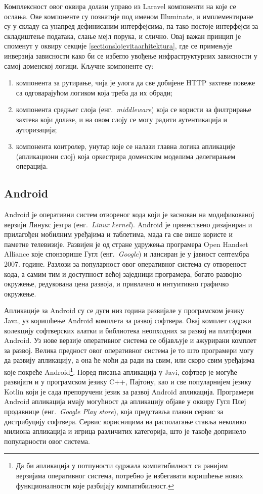 \documentclass[12pt,oneside]{memoir}
\begin{document}
Комплексност овог оквира долази управо из Laravel компоненти на које се ослања. Ове компоненте су познатије под именом Illuminate, и имплементиране су у складу са унапред дефинисаним интерфејсима, па тако постоје интерфејси за складиштење података, слање мејл порука, и слично. Овај важан принцип је споменут у оквиру секције \ref{sectionslojevitaarhitektura}, где се примењује инверзија зависности како би се избегло увођење инфраструктурних зависности у самој доменској логици. Кључне компоненте су:
\begin{enumerate}
\item компонента за рутирање, чија је улога да све добијене HTTP захтеве повеже са одговарајућом логиком која треба да их обради;
\item компонента средњег слоја (енг.~\textit{middleware}) која се користи за филтрирање захтева који долазе, и на овом слоју се могу радити аутентикација и ауторизација;
\item компонента контролер, унутар које се налази главна логика апликације (апликациони слој) која оркестрира доменским моделима делегирањем операција.
\end{enumerate}

\subsection{Android}
Android \cite{Android} је оперативни систем отвореног кода који је заснован на модификованој верзији Линукс језгра (енг.~\textit{Linux kernel}). Android је првенствено дизајниран и прилагођен мобилним уређајима и таблетима, мада га све више користе и паметне телевизије. Развијен је од стране удружења програмера Open Handset Alliance које спонзорише Гугл (енг.~\textit{Google}) и лансиран је у јавност септембра 2007. године. Разлози за популарност овог оперативног система су отвореност кода, а самим тим и доступност већој заједници програмера, богато развојно окружење, редукована цена развоја, и привлачно и интуитивно графичко окружење.

Апликације за Android су се дуги низ година развијале у програмском језику Java, уз коришћење Android комплета за развој софтвера. Овај комплет садржи колекцију софтверских алатки и библиотека неопходних за развој на платформи Android. Уз нове верзије оперативног система се објављује и ажурирани комплет за развој. Велика предност овог оперативног система је то што програмери могу да развију апликацију, а она ће моћи да ради на свим, или скоро свим уређајима које покреће Android\footnote{Да би апликација у потпуности одржала компатибилност са ранијим верзијама оперативног система, потребно је избегавати коришћење нових функционалности које разбијају компатибилност.}. Поред писања апликација у Javi, софтвер је могуће развијати и у програмском језику C++, Пајтону, као и све популарнијем језику Kotlin који је сада препоручени језик за развој Android апликација. Програмери Android апликација имају могућност да апликацију објаве у оквиру Гугл Плеј продавнице (енг.~\textit{Google Play store}), која представља главни сервис за дистрибуцију софтвера. Сервис корисницима на располагање ставља неколико милиона апликација и игрица различитих категорија, што је такође допринело популарности овог система.
\end{document}
